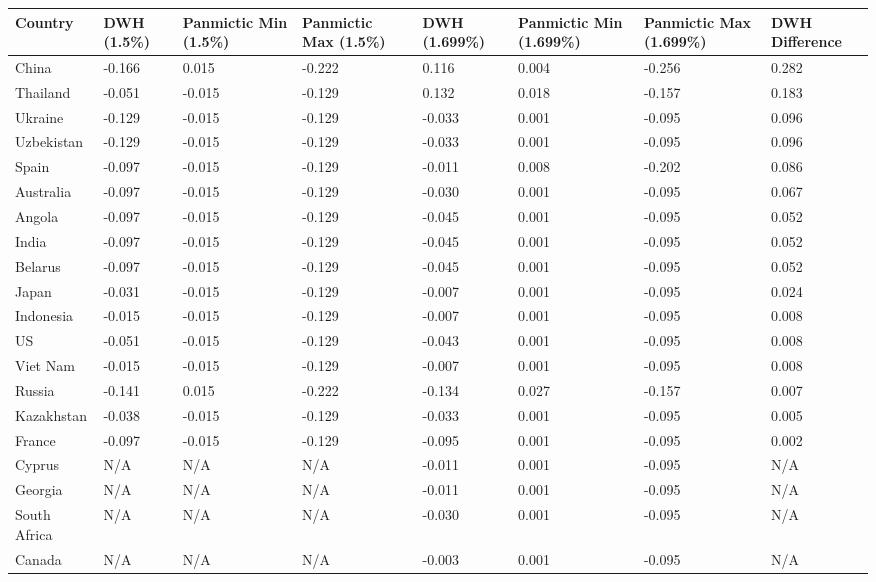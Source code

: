 \documentclass[utf8]{FrontiersinHarvard} %
\begin{document}
\begin{table}[h!]
\centering
\begin{tabularx}{\textwidth}{|l|X|X|X|X|X|X|X|}
\hline
\textbf{Country} & \textbf{DWH (1.5\%)} & \textbf{Panmictic Min (1.5\%)} & \textbf{Panmictic Max (1.5\%)} & \textbf{DWH (1.699\%)} & \textbf{Panmictic Min (1.699\%)} & \textbf{Panmictic Max (1.699\%)} & \textbf{DWH Difference} \\
\hline
China & -0.166 & 0.015 & -0.222 & 0.116 & 0.004 & -0.256 & 0.282 \\
Thailand & -0.051 & -0.015 & -0.129 & 0.132 & 0.018 & -0.157 & 0.183 \\
Ukraine & -0.129 & -0.015 & -0.129 & -0.033 & 0.001 & -0.095 & 0.096 \\
Uzbekistan & -0.129 & -0.015 & -0.129 & -0.033 & 0.001 & -0.095 & 0.096 \\
Spain & -0.097 & -0.015 & -0.129 & -0.011 & 0.008 & -0.202 & 0.086\\
Australia & -0.097 & -0.015 & -0.129 & -0.030 & 0.001 & -0.095 & 0.067\\
Angola & -0.097 & -0.015 & -0.129 & -0.045 & 0.001 & -0.095 & 0.052\\
India & -0.097 & -0.015 & -0.129 & -0.045 & 0.001 & -0.095 & 0.052\\
Belarus & -0.097 & -0.015 & -0.129 & -0.045 & 0.001 & -0.095 & 0.052\\
Japan & -0.031 & -0.015 & -0.129 & -0.007 & 0.001 & -0.095 & 0.024\\
Indonesia & -0.015 & -0.015 & -0.129 & -0.007 & 0.001 & -0.095 & 0.008\\
US & -0.051 & -0.015 & -0.129 & -0.043 & 0.001 & -0.095 & 0.008\\
Viet Nam & -0.015 & -0.015 & -0.129 & -0.007 & 0.001 & -0.095 & 0.008\\
Russia & -0.141 & 0.015 & -0.222 & -0.134 & 0.027 & -0.157 & 0.007\\
Kazakhstan & -0.038 & -0.015 & -0.129 & -0.033 & 0.001 & -0.095 & 0.005\\
France & -0.097 & -0.015 & -0.129 & -0.095 & 0.001 & -0.095 & 0.002\\
Cyprus & N/A & N/A & N/A & -0.011 & 0.001 & -0.095 & N/A\\
Georgia & N/A & N/A & N/A & -0.011 & 0.001 & -0.095 & N/A\\
South Africa & N/A & N/A & N/A & -0.030 & 0.001 & -0.095 & N/A\\
Canada & N/A & N/A & N/A & -0.003 & 0.001 & -0.095 & N/A\\

\end{tabularx}
\end{table}
\end{document}
